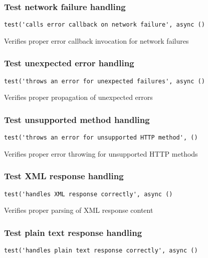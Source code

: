 \documentclass[a4paper]{article}
\begin{document}
\hypertarget{toc77}{}
\subsubsection{Test network failure handling}

\begin{lstlisting}
test('calls error callback on network failure', async ()
\end{lstlisting}

Verifies proper error callback invocation for network failures

\hypertarget{toc78}{}
\subsubsection{Test unexpected error handling}

\begin{lstlisting}
test('throws an error for unexpected failures', async ()
\end{lstlisting}

Verifies proper propagation of unexpected errors

\hypertarget{toc79}{}
\subsubsection{Test unsupported method handling}

\begin{lstlisting}
test('throws an error for unsupported HTTP method', ()
\end{lstlisting}

Verifies proper error throwing for unsupported HTTP methods

\hypertarget{toc80}{}
\subsubsection{Test XML response handling}

\begin{lstlisting}
test('handles XML response correctly', async ()
\end{lstlisting}

Verifies proper parsing of XML response content

\hypertarget{toc81}{}
\subsubsection{Test plain text response handling}

\begin{lstlisting}
test('handles plain text response correctly', async ()
\end{lstlisting}
\end{document}
